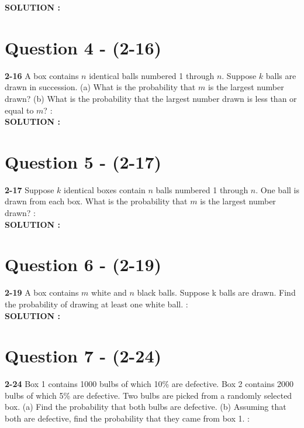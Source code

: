 \documentclass{article}
\begin{document}
\hspace{1em} \large{\textbf{SOLUTION :}} \\

\section{Question 4 - (2-16)}
\label{Q4}
\textbf{2-16}  A box contains $n$ identical balls numbered 1 through $n$. Suppose $k$ balls are drawn in succession. (a) What is the probability that $m$ is the largest number drawn? (b) What is the probability that the largest number drawn is less than or equal to $m$?  : \\

\hspace{1em} \large{\textbf{SOLUTION :}} \\

\section{Question 5 - (2-17)}
\label{Q5}
\textbf{2-17}  Suppose $k$ identical boxes contain $n$ balls numbered 1 through $n$. One ball is drawn from each box. What is the probability that $m$ is the largest number drawn?  : \\

\hspace{1em} \large{\textbf{SOLUTION :}} \\

\section{Question 6 - (2-19)}
\label{Q6}
\textbf{2-19} A box contains $m$ white and $n$ black balls. Suppose k balls are drawn. Find the probability of drawing at least one white ball.  : \\

\hspace{1em} \large{\textbf{SOLUTION :}} \\

\section{Question 7 - (2-24)}
\label{Q7}
\textbf{2-24}  Box 1 contains 1000 bulbs of which 10\% are defective. Box 2 contains 2000 bulbs of which 5\% are defective. Two bulbs are picked from a randomly selected box. (a) Find the probability that both bulbs are defective. (b) Assuming that both are defective, find the probability that they came from box 1.  : \\
\end{document}
